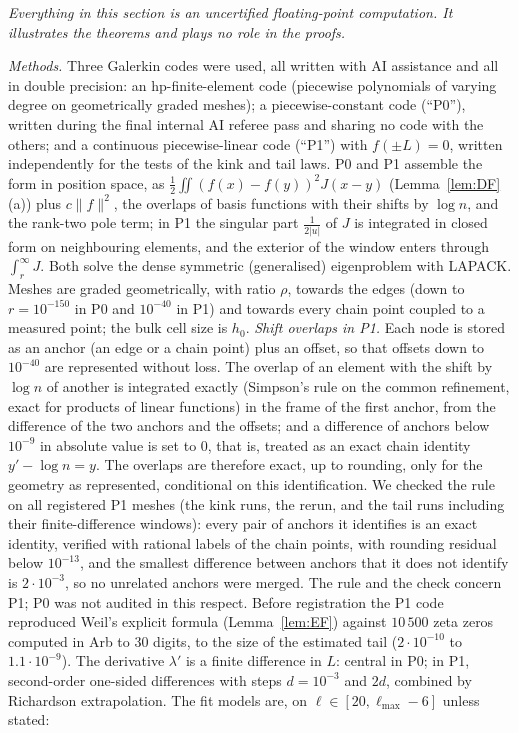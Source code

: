 \documentclass[11pt]{amsart}
\newcommand{\e}[1]{\cdot 10^{#1}}
\theoremstyle{definition}
\theoremstyle{remark}
\numberwithin{equation}{section}
\begin{document}
\emph{Everything in this section is an uncertified floating-point computation. It illustrates the theorems and plays no role in the proofs.}

\emph{Methods.} Three Galerkin codes were used, all written with AI assistance and all in double precision: an hp-finite-element code (piecewise polynomials of varying degree on geometrically graded meshes); a piecewise-constant code (``P0''), written during the final internal AI referee pass and sharing no code with the others; and a continuous piecewise-linear code (``P1'') with $f(\pm L)=0$, written independently for the tests of the kink and tail laws. P0 and P1 assemble the form in position space, as $\frac12\iint(f(x)-f(y))^2J(x-y)$ (Lemma~\ref{lem:DF}(a)) plus $c\|f\|^2$, the overlaps of basis functions with their shifts by $\log n$, and the rank-two pole term; in P1 the singular part $\frac1{2|u|}$ of $J$ is integrated in closed form on neighbouring elements, and the exterior of the window enters through $\int_r^\infty J$. Both solve the dense symmetric (generalised) eigenproblem with LAPACK. Meshes are graded geometrically, with ratio $\rho$, towards the edges (down to $r=10^{-150}$ in P0 and $10^{-40}$ in P1) and towards every chain point coupled to a measured point; the bulk cell size is $h_0$. \emph{Shift overlaps in P1.} Each node is stored as an anchor (an edge or a chain point) plus an offset, so that offsets down to $10^{-40}$ are represented without loss. The overlap of an element with the shift by $\log n$ of another is integrated exactly (Simpson's rule on the common refinement, exact for products of linear functions) in the frame of the first anchor, from the difference of the two anchors and the offsets; and a difference of anchors below $10^{-9}$ in absolute value is set to $0$, that is, treated as an exact chain identity $y'-\log n=y$. The overlaps are therefore exact, up to rounding, only for the geometry as represented, conditional on this identification. We checked the rule on all registered P1 meshes (the kink runs, the rerun, and the tail runs including their finite-difference windows): every pair of anchors it identifies is an exact identity, verified with rational labels of the chain points, with rounding residual below $10^{-13}$, and the smallest difference between anchors that it does not identify is $2\e{-3}$, so no unrelated anchors were merged. The rule and the check concern P1; P0 was not audited in this respect. Before registration the P1 code reproduced Weil's explicit formula (Lemma~\ref{lem:EF}) against $10\,500$ zeta zeros computed in Arb to $30$ digits, to the size of the estimated tail ($2\e{-10}$ to $1.1\e{-9}$). The derivative $\lambda'$ is a finite difference in $L$: central in P0; in P1, second-order one-sided differences with steps $d=10^{-3}$ and $2d$, combined by Richardson extrapolation. The fit models are, on $\ell\in[20,\ell_{\max}-6]$ unless stated:
\end{document}
